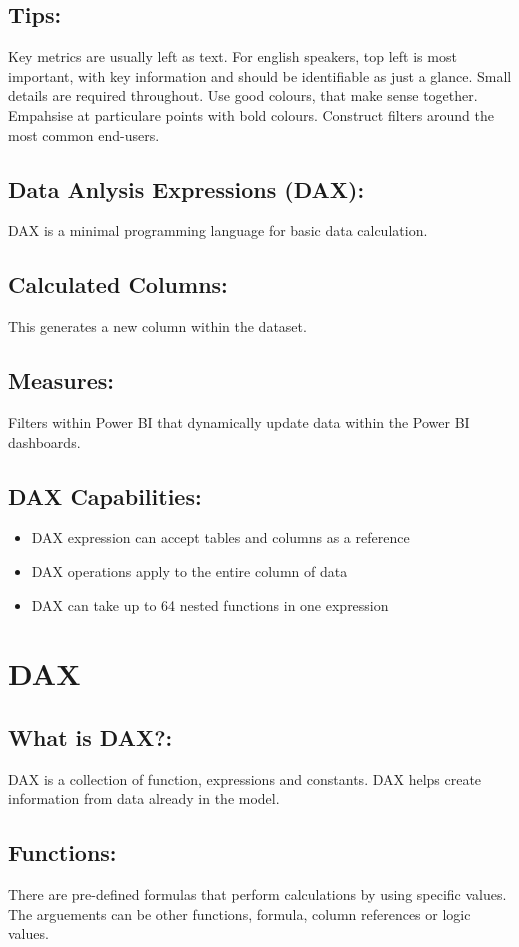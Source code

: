 \documentclass[a5paper]{article}
\begin{document}
	\subsection{Tips:}
	Key metrics are usually left as text. For english speakers, top left is most important, with key information and should be identifiable as just a glance. Small details are required throughout. Use good colours, that make sense together. Empahsise at particulare points with bold colours. Construct filters around the most common end-users.
	\subsection{Data Anlysis Expressions (DAX):}
	DAX is a minimal programming language for basic data calculation.
	\subsection{Calculated Columns:}
	This generates a new column within the dataset.
	\subsection{Measures:}
	Filters within Power BI that dynamically update data within the Power BI dashboards.
	\subsection{DAX Capabilities:}
	\begin{itemize}
		\item DAX expression can accept tables and columns as a reference
		\item DAX operations apply to the entire column of data
		\item DAX can take up to 64 nested functions in one expression
	\end{itemize}

	\section{DAX}
	\subsection{What is DAX?:}
	DAX is a collection of function, expressions and constants. DAX helps create information from data already in the model.
	\subsection{Functions:}
	There are pre-defined formulas that perform calculations by using specific values. The arguements can be other functions, formula, column references or logic values.
\end{document}

